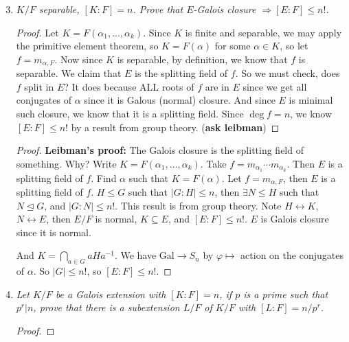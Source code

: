 \documentclass[9pt,reqno,twoside]{amsbook}
\theoremstyle{plain}
\numberwithin{section}{chapter}
\numberwithin{equation}{chapter}
\theoremstyle{definition}
\theoremstyle{remark}
\theoremstyle{plain}
\newcommand{\norm}{\trianglelefteq}
\newcommand{\sub}{\subseteq}
\newcommand{\counter}{\setcounter}
\newcommand{\gal}{\mathrm{Gal}}
\renewcommand{\leq}{\leqslant}
\renewcommand{\phi}{\varphi}
\begin{document}
\begin{enumerate}[label=\arabic*.]
\counter{enumi}{2}

\item \textit{$K/F$ separable, $[K:F] = n$. Prove that $E$-Galois closure $\Rightarrow [E:F] \leq n!$. }

\begin{proof}
Let $K = F(\alpha_1,...,\alpha_k)$. Since $K$ is finite and separable, we may apply the primitive element theorem, so $K = F(\alpha)$ for some $\alpha \in K$, so let $f = m_{\alpha,F}$. Now since $K$ is separable, by definition, we know that $f$ is separable. We claim that $E$ is the splitting field of $f$. So we must check, does $f$ split in $E$? It does because ALL roots of $f$ are in $E$ since we get all conjugates of $\alpha$ since it is Galous (normal) closure. And since $E$ is minimal such closure, we know that it is a splitting field. Since $\deg f = n$, we know $[E:F] \leq n!$ by a result from group theory. (\textbf{ask leibman})
\end{proof}

\begin{proof}
\textbf{Leibman's proof: }
The Galois closure is the splitting field of something. Why? Write $K = F(\alpha_1,...,\alpha_k)$. Take $f = m_{\alpha_1}\cdots m_{\alpha_k}$. Then $E$ is a splitting field of $f$. Find $\alpha$ such that $K = F(\alpha)$. Let $f = m_{\alpha,F}$, then $E$ is a splitting field of $f$. $H\leq G$ such that $|G:H| \leq n$, then $\exists N \leq H$ such that $N \norm G$, and $|G:N| \leq n!$. This result is from group theory. Note $H \leftrightarrow K$, $N \leftrightarrow E$, then $E/F$ is normal, $K \sub E$, and $[E:F] \leq n!$. $E$ is Galois closure since it is normal. 




And $K = \bigcap_{a \in G}aHa^{-1}$. We have $\gal \to S_n$ by $\phi \mapsto$ action on the conjugates of $\alpha$. So $|G| \leq n!$, so $[E:F] \leq n!$.
\end{proof}

\item \textit{Let $K/F$ be a Galois extension with $[K:F] = n$, if $p$ is a prime such that $p^r|n$, prove that there is a subextension $L/F$ of $K/F$ with $[L:F] = n/p^r$. }

\begin{proof}

\end{proof}




\counter{enumi}{5}


\end{enumerate}
\end{document}
